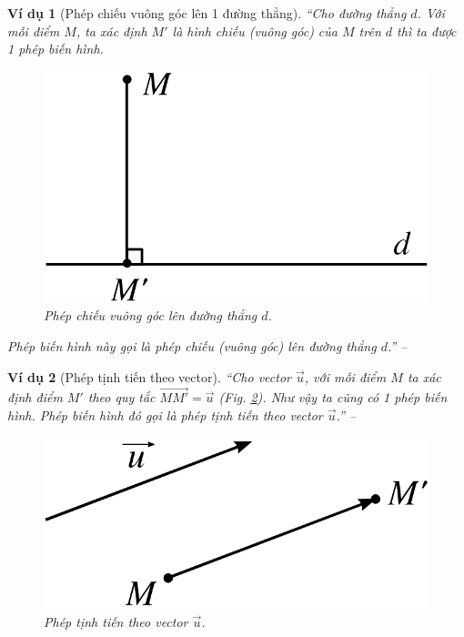 \documentclass[oneside]{book}
\numberwithin{equation}{section}
\newtheorem{vidu}{Ví dụ}[section]
\begin{document}
\begin{vidu}[Phép chiếu vuông góc lên 1 đường thẳng]
	``Cho đường thẳng $d$. Với mỗi điểm $M$, ta xác định $M'$ là hình chiếu (vuông góc) của $M$ trên $d$ thì ta được 1 phép biến hình.
	
	\begin{figure}[H]
		\centering
		\includegraphics[scale=0.15]{phep_chieu_vuong_goc}
		\caption{Phép chiếu vuông góc lên đường thẳng $d$.}
		\label{fig:phep chieu vuong goc len duong thang}
	\end{figure}
	Phép biến hình này gọi là \emph{phép chiếu (vuông góc) lên đường thẳng $d$}.'' -- \cite[p. 4]{SGK_Toan_11_hinh_hoc_nang_cao}
\end{vidu}

\begin{vidu}[Phép tịnh tiến theo vector]
	``Cho vector $\vec{u}$, với mỗi điểm $M$ ta xác định điểm $M'$ theo quy tắc $\overrightarrow{MM'} = \vec{u}$ (Fig. \ref{fig:phep tinh tien theo vector}). Như vậy ta cũng có 1 phép biến hình. Phép biến hình đó gọi là \emph{phép tịnh tiến theo vector $\vec{u}$}.'' -- \cite[p. 4]{SGK_Toan_11_hinh_hoc_nang_cao}
	
	\begin{figure}[H]
		\centering
		\includegraphics[scale=0.15]{phep_tinh_tien_theo_vector}
		\caption{Phép tịnh tiến theo vector $\vec{u}$.}
		\label{fig:phep tinh tien theo vector}
	\end{figure}	
\end{vidu}
\end{document}
